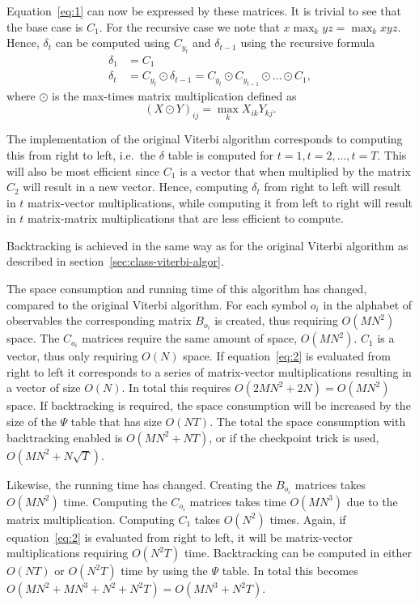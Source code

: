 Equation~\eqref{eq:1} can now be expressed by these matrices. It is trivial to
see that the base case is $C_1$. For the recursive case we note that
$x \max_k y z = \max_k x y z$. Hence, $\delta_t$ can be computed using $C_{y_t}$
and $\delta_{t - 1}$ using the recursive formula
\begin{equation}
  \label{eq:2}
  \begin{aligned}
    \delta_1 &= C_1 \\
    \delta_t &= C_{y_t} \odot \delta_{t - 1} = C_{y_t} \odot C_{y_{t-1}} \odot \dots \odot C_1,
  \end{aligned}
\end{equation}
where $\odot$ is the max-times matrix multiplication defined as
\begin{equation*}
{(X \odot Y)}_{ij} = \max_k X_{ik} Y_{kj}.
\end{equation*}

The implementation of the original Viterbi algorithm corresponds to
computing this from right to left, i.e.\ the $\delta$ table is computed for $t
= 1, t=2, \dots, t=T$. This will also be most efficient since
$C_1$ is a vector that when multiplied by the matrix $C_2$ will result in a new
vector. Hence, computing $\delta_t$ from right to left will result in $t$
matrix-vector multiplications, while computing it from left to right will
result in $t$ matrix-matrix multiplications that are less efficient to compute.

Backtracking is achieved in the same way as for the original Viterbi algorithm
as described in section~\ref{sec:class-viterbi-algor}.

The space consumption and running time of this algorithm has changed, compared
to the original Viterbi algorithm. For each symbol $o_i$ in the alphabet of
observables the corresponding matrix $B_{o_i}$ is created, thus requiring
$O(M N^2)$ space. The $C_{o_i}$ matrices require the same amount of space,
$O(M N^2)$. $C_1$ is a vector, thus only requiring $O(N)$ space. If
equation~\eqref{eq:2} is evaluated from right to left it corresponds to a
series of matrix-vector multiplications resulting in a vector of size $O(N)$.
In total this requires $O(2 M N^2 + 2 N) = O(M N^2)$ space. If backtracking is
required, the space consumption will be increased by the size of the $\Psi$
table that has size $O(N T)$. The total the space consumption with backtracking
enabled is $O(M N^2 + N T)$, or if the checkpoint trick is used, $O(M N^2 +
N \sqrt{T})$.

Likewise, the running time has changed. Creating the $B_{o_i}$ matrices takes
$O(M N^2)$ time. Computing the $C_{o_i}$ matrices takes time $O(M N^3)$ due to
the matrix multiplication. Computing $C_1$ takes $O(N^2)$ times. Again, if
equation~\eqref{eq:2} is evaluated from right to left, it will be matrix-vector
multiplications requiring $O(N^2 T)$ time. Backtracking can be computed in either
$O(NT)$ or $O(N^2 T)$ time by using the $\Psi$ table. In total this becomes
$O(M N^2 + M N^3 + N^2 + N^2 T) = O(M N^3 + N^2 T)$.

